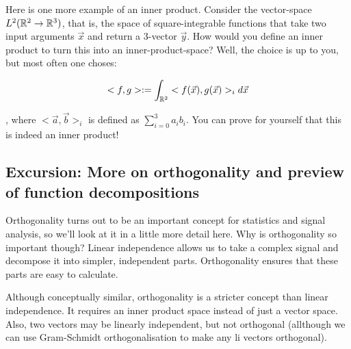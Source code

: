 Here is one more example of an inner product. Consider the vector-space $L^2(\mathbb{R}^2 \to \mathbb{R}^3)$, that is, the space of square-integrable functions that take two input arguments $\vec{x}$ and return a 3-vector $\vec{y}$. How would you define an inner product to turn this into an inner-product-space? Well, the choice is up to you, but most often one choses: 

$$ <f, g> := \int_{\mathbb{R}^2} <f(\vec{x}), g(\vec{x})>_i \mathop{d\vec{x}} $$

, where $ <\vec{a}, \vec{b}>_i$ is defined as $\sum_{i=0}^3 a_i b_i$. You can prove for yourself that this is indeed an inner product! 














\subsection{Excursion: More on orthogonality and preview of function decompositions}

Orthogonality turns out to be an important concept for statistics and signal analysis, so we'll look at it in a little more detail here. Why is orthogonality so important though? Linear independence allows us to take a complex signal and decompose it into simpler, independent parts. Orthogonality ensures that these parts are easy to calculate. 

Although conceptually similar, orthogonality is a stricter concept than linear independence. It requires an inner product space instead of just a vector space. Also, two vectors may be linearly independent, but not orthogonal (allthough we can use Gram-Schmidt orthogonalisation to make any li vectors orthogonal).


